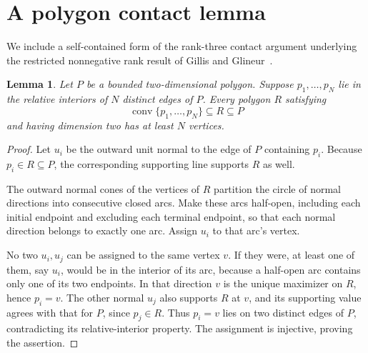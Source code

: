 \documentclass[11pt]{article}
\newtheorem{lemma}[theorem]{Lemma}
\newcommand{\conv}{\operatorname{conv}}
\begin{document}
\section{A polygon contact lemma}
We include a self-contained form of the rank-three contact argument underlying the restricted nonnegative rank result of Gillis and Glineur~\cite[Theorem 8]{gg}.
\begin{lemma}\label{lem:contact}
Let $P$ be a bounded two-dimensional polygon. Suppose $p_1,\ldots,p_N$ lie in the relative interiors of $N$ distinct edges of $P$. Every polygon $R$ satisfying
\[
 \conv\{p_1,\ldots,p_N\}\subseteq R\subseteq P
\]
and having dimension two has at least $N$ vertices.
\end{lemma}
\begin{proof}
Let $u_i$ be the outward unit normal to the edge of $P$ containing $p_i$. Because $p_i\in R\subseteq P$, the corresponding supporting line supports $R$ as well.

The outward normal cones of the vertices of $R$ partition the circle of normal directions into consecutive closed arcs. Make these arcs half-open, including each initial endpoint and excluding each terminal endpoint, so that each normal direction belongs to exactly one arc. Assign $u_i$ to that arc's vertex.

No two $u_i,u_j$ can be assigned to the same vertex $v$. If they were, at least one of them, say $u_i$, would be in the interior of its arc, because a half-open arc contains only one of its two endpoints. In that direction $v$ is the unique maximizer on $R$, hence $p_i=v$. The other normal $u_j$ also supports $R$ at $v$, and its supporting value agrees with that for $P$, since $p_j\in R$. Thus $p_i=v$ lies on two distinct edges of $P$, contradicting its relative-interior property. The assignment is injective, proving the assertion.
\end{proof}
\end{document}
